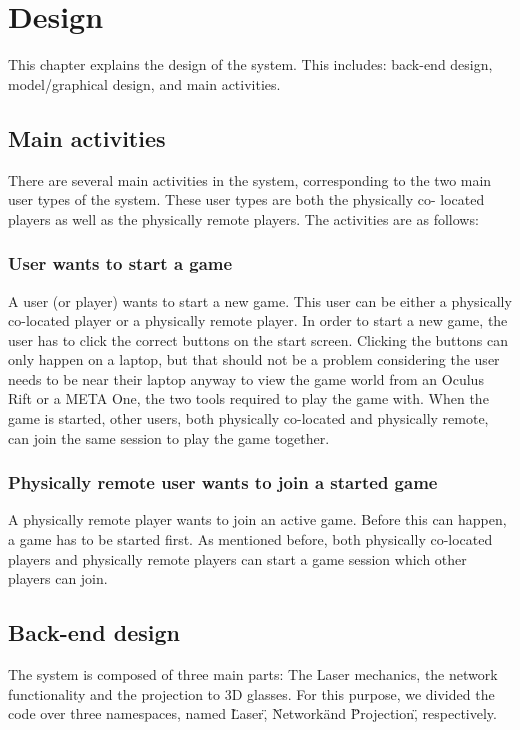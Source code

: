 \chapter{Design} \label{cha:design}
	This chapter explains the design of the system. This includes: back-end
	design, model/graphical design, and main activities.

	\section{Main activities} \label{sec:mainactivities}
		There are several main activities in the system, corresponding to the two
		main user types of the system. These user types are both the physically co-
		located	players as well as the physically remote players. The activities
		are as follows:

		\subsection{User wants to start a game} \label{ssec:userstartgame}
			A user (or player) wants to start a new game. This user can be either
			a physically co-located player or a physically remote player. In
			order to start a new game, the user has to click the correct buttons
			on the start screen. Clicking the buttons can only happen on a laptop,
			but that should not be a problem considering the user needs to be near
			their laptop anyway to view the game world from an Oculus Rift or a
			META One, the two tools required to play the game with. When the game
			is started, other users, both physically co-located and physically
			remote, can join the same session to play the game together.

		\subsection{Physically remote user wants to join a started game}
				\label{ssec:remotejoingame}
			A physically remote player wants to join an active game. Before this can
			happen, a game has to be started first. As mentioned before, both physically
			co-located players and physically remote players can start a game session
			which other players can join.

	\section{Back-end design} \label{sec:backenddesign}
		The system is composed of three main parts: The Laser mechanics, the network
		functionality and the projection to 3D glasses. For this purpose, we divided
		the code over three namespaces, named \"Laser\", \"Network\" and
		\"Projection\", respectively.


